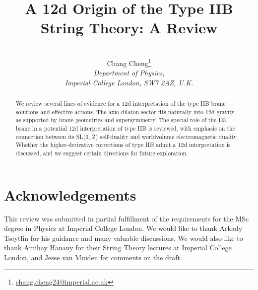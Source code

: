 \documentclass[11pt]{article}
\title{A 12d Origin of the Type IIB String Theory: A Review}
\author{
\\[2pt]
\large{Chang Cheng}\footnote{\href{mailto:chang.cheng24@imperial.ac.uk}{chang.cheng24@imperial.ac.uk}} 
\\[10pt]
\it{Department of Physics,}\\
\it{Imperial College London, SW7 2AZ, U.K.}
\\[2pt]
}
\date{}
\begin{document}
\maketitle



\begin{abstract}
We review several lines of evidence for a 12d interpretation of the type IIB brane solutions and effective actions.
The axio-dilaton sector fits naturally into 12d gravity, as supported by brane geometries and supersymmetry.
The special role of the D3 brane in a potential 12d interpretation of type IIB is reviewed, with emphasis on the connection between its SL(2, Z) self-duality and worldvolume electromagnetic duality.
Whether the higher-derivative corrections of type IIB admit a 12d interpretation is discussed, and we suggest certain directions for future exploration.
\end{abstract}
\tableofcontents










\section{Acknowledgements}
This review was submitted in partial fulfillment of the requirements for the MSc degree in Physics at Imperial College London.
We would like to thank Arkady Tseytlin for his guidance and many valuable discussions.
{\color{orange}We would also like to thank Amihay Hanany for their String Theory lectures at Imperial College London, and Jesse van Muiden for comments on the draft. }

\newpage
\appendix









\end{document}

